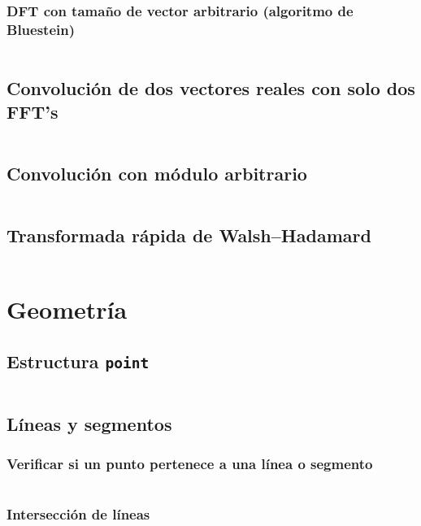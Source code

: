 \documentclass[11pt]{article}
\begin{document}
			\subsubsection{DFT con tamaño de vector arbitrario (algoritmo de Bluestein)}
			\inputminted[tabsize=2,breaklines,firstline=322,lastline=342,fontsize=\small]{c++}{fft.cpp}
			
		\subsection{Convolución de dos vectores reales con solo dos FFT's}
		\inputminted[tabsize=2,breaklines,firstline=344,lastline=364,fontsize=\small]{c++}{fft.cpp}
			
		\subsection{Convolución con módulo arbitrario}
		\inputminted[tabsize=2,breaklines,firstline=366,lastline=423,fontsize=\small]{c++}{fft.cpp}
		
		\subsection{Transformada rápida de Walsh–Hadamard}
		\inputminted[tabsize=2,breaklines,firstline=425,lastline=456,fontsize=\small]{c++}{fft.cpp}
			
	\newpage
	\section{Geometría}
		\subsection{Estructura \texttt{point}}
		\inputminted[tabsize=2,breaklines,firstline=3,lastline=60,fontsize=\small]{c++}{geometry.cpp}
		
		\subsection{Líneas y segmentos}
			\subsubsection{Verificar si un punto pertenece a una línea o segmento}
			\inputminted[tabsize=2,breaklines,firstline=62,lastline=70,fontsize=\small]{c++}{geometry.cpp}
			
			\subsubsection{Intersección de líneas}
			\inputminted[tabsize=2,breaklines,firstline=72,lastline=91,fontsize=\small]{c++}{geometry.cpp}
			
\end{document}
